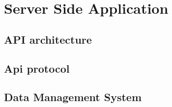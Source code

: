 \section{Server Side Application}




\subsection{API architecture}
\label{sec:api_architecture}


\subsection{Api protocol}
\label{sec:api_protocol}


\subsection{Data Management System}
\label{sec:dms_implementation}
